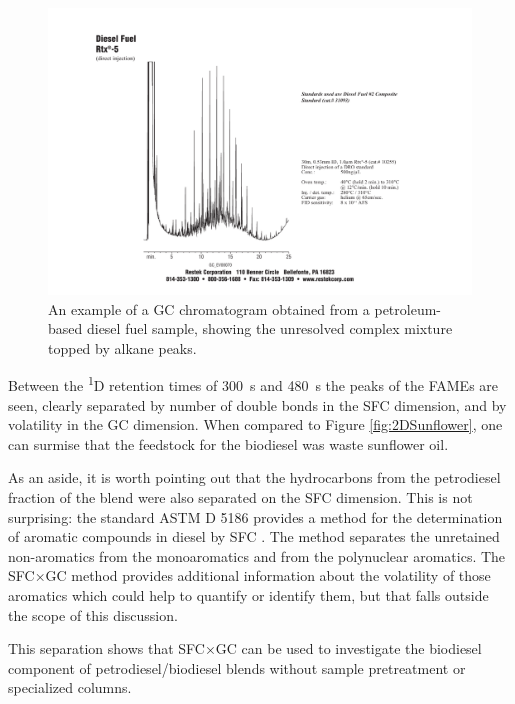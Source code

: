 \begin{figure}
	\centering
	\includegraphics[width=\textwidth]{Figures/hchump.pdf}
	\decoRule	
	
\caption[An example of a petrochemical fuel chromatogram.]{An example of a GC
chromatogram obtained from a petroleum-based diesel fuel sample, showing the
unresolved complex mixture topped by alkane peaks.}
	
	\label{fig:HCHump} 
\end{figure}

Between the \textsuperscript{1}D retention times of \SI{300}{\second} and
\SI{480}{\second} the peaks of the FAMEs are seen, clearly separated by number
of double bonds in the SFC dimension, and by volatility in the GC dimension.
When compared to Figure \ref{fig:2DSunflower}, one can surmise that the
feedstock for the biodiesel was waste sunflower oil.

As an aside, it is worth pointing out that the hydrocarbons from the petrodiesel
fraction of the blend were also separated on the SFC dimension. This is not
surprising: the standard ASTM D 5186 provides a method for the determination of
aromatic compounds in diesel by SFC \autocite{ASTMD5186}. The method separates
the unretained non-aromatics from the monoaromatics and from the polynuclear
aromatics. The SFC×GC method provides additional information about the
volatility of those aromatics which could help to quantify or identify them, but
that falls outside the scope of this discussion.

This separation shows that SFC×GC can be used to investigate the biodiesel
component of petrodiesel/biodiesel blends without sample pretreatment or
specialized columns.

